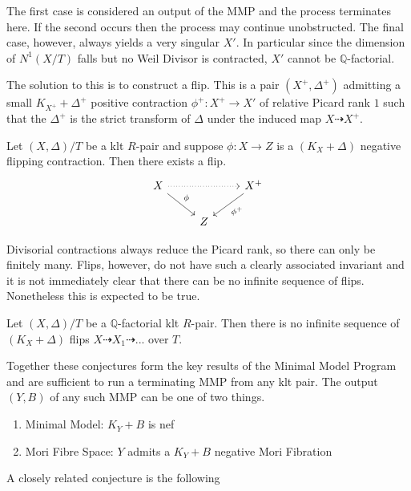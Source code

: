 The first case is considered an output of the MMP and the process terminates here. If the second occurs then the process may continue unobstructed. The final case, however, always yields a very singular $X'$. In particular since the dimension of $N^{1}(X/T)$ falls but no Weil Divisor is contracted, $X'$ cannot be $\mathbb{Q}$-factorial.

The solution to this is to construct a flip. This is a pair $(X^{+},\Delta^{+})$ admitting a small $K_{X^{+}} +\Delta^{+}$ positive contraction $\phi^{+}:X^{+} \to X'$ of relative Picard rank $1$ such that the $\Delta ^{+}$ is the strict transform of $\Delta$ under the induced map $X \dashrightarrow X^{+}$.

\begin{conjecture}\label{flips-conj}
	Let $(X,\Delta)/T$ be a klt $R$-pair and suppose $\phi\colon X \to Z$ is a $(K_{X}+\Delta)$ negative flipping contraction. Then there exists a flip. \[\begin{tikzcd}
	X \arrow[rr, dotted] \arrow[rd, "\phi"] &   & X^{+} \arrow[ld, "\phi^{+}"] \\
	& Z &                             
	\end{tikzcd}\]	
\end{conjecture}

Divisorial contractions always reduce the Picard rank, so there can only be finitely many. Flips, however, do not have such a clearly associated invariant and it is not immediately clear that there can be no infinite sequence of flips. Nonetheless this is expected to be true.

\begin{conjecture}
	
	Let $(X,\Delta)/T$ be a $\mathbb{Q}$-factorial klt $R$-pair. Then there is no infinite sequence of $(K_{X}+\Delta)$ flips $X \dashrightarrow X_{1} \dashrightarrow ...$ over $T$.
	
	\end{conjecture}

Together these conjectures form the key results of the Minimal Model Program and are sufficient to run a terminating MMP from any klt pair. The output $(Y,B)$ of any such MMP can be one of two things.

\begin{enumerate}
	\item Minimal Model: $K_{Y}+B$ is nef
	\item Mori Fibre Space: $Y$ admits a $K_{Y}+B$ negative Mori Fibration
\end{enumerate}
A closely related conjecture is the following

